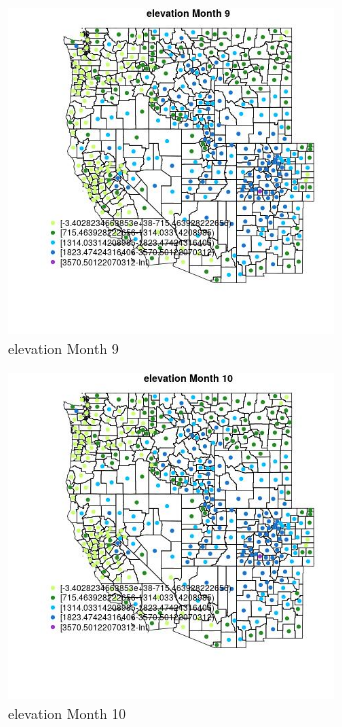 \begin{figure} 
\centering  
\includegraphics[width=0.77\textwidth]{Code_Outputs/df_report_ML_predictors_CountyCentroid_Locations_Dates_2008-01-01to2018-12-31_MapObsMo9elevation.jpg} 
\caption{\label{fig:df_report_ML_predictors_CountyCentroid_Locations_Dates_2008-01-01to2018-12-31MapObsMo9elevation}elevation Month 9} 
\end{figure} 
 

\begin{figure} 
\centering  
\includegraphics[width=0.77\textwidth]{Code_Outputs/df_report_ML_predictors_CountyCentroid_Locations_Dates_2008-01-01to2018-12-31_MapObsMo10elevation.jpg} 
\caption{\label{fig:df_report_ML_predictors_CountyCentroid_Locations_Dates_2008-01-01to2018-12-31MapObsMo10elevation}elevation Month 10} 
\end{figure} 
 

